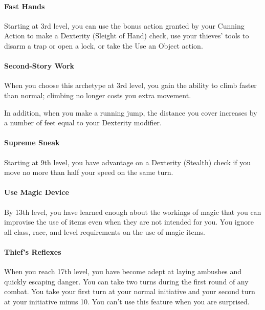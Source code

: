 \documentclass[
]{article}
\begin{document}
\hypertarget{fast-hands}{%
\paragraph{Fast Hands}\label{fast-hands}}

Starting at 3rd level, you can use the bonus action granted by your
Cunning Action to make a Dexterity (Sleight of Hand) check, use your
thieves' tools to disarm a trap or open a lock, or take the Use an
Object action.

\hypertarget{second-story-work}{%
\paragraph{Second-Story Work}\label{second-story-work}}

When you choose this archetype at 3rd level, you gain the ability to
climb faster than normal; climbing no longer costs you extra movement.

In addition, when you make a running jump, the distance you cover
increases by a number of feet equal to your Dexterity modifier.

\hypertarget{supreme-sneak}{%
\paragraph{Supreme Sneak}\label{supreme-sneak}}

Starting at 9th level, you have advantage on a Dexterity (Stealth) check
if you move no more than half your speed on the same turn.

\hypertarget{use-magic-device}{%
\paragraph{Use Magic Device}\label{use-magic-device}}

By 13th level, you have learned enough about the workings of magic that
you can improvise the use of items even when they are not intended for
you. You ignore all class, race, and level requirements on the use of
magic items.

\hypertarget{thiefs-reflexes}{%
\paragraph{Thief's Reflexes}\label{thiefs-reflexes}}

When you reach 17th level, you have become adept at laying ambushes and
quickly escaping danger. You can take two turns during the first round
of any combat. You take your first turn at your normal initiative and
your second turn at your initiative minus 10. You can't use this feature
when you are surprised.
\end{document}
